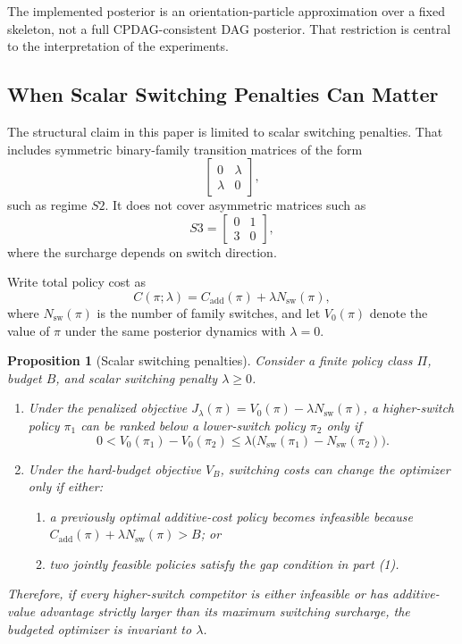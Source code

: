 \documentclass[10pt]{article}
\newcommand{\VB}{V_B}
\newcommand{\Jlambda}{J_\lambda}
\newcommand{\Nsw}{N_{\mathrm{sw}}}
\newtheorem{proposition}{Proposition}
\begin{document}
The implemented posterior is an orientation-particle approximation over a fixed skeleton, not a full CPDAG-consistent DAG posterior. That restriction is central to the interpretation of the experiments.

\subsection{When Scalar Switching Penalties Can Matter}
The structural claim in this paper is limited to scalar switching penalties. That includes symmetric binary-family transition matrices of the form
\[
\begin{bmatrix}
0 & \lambda \\
\lambda & 0
\end{bmatrix},
\]
such as regime $S2$. It does not cover asymmetric matrices such as
\[
S3=
\begin{bmatrix}
0 & 1 \\
3 & 0
\end{bmatrix},
\]
where the surcharge depends on switch direction.

Write total policy cost as
\begin{equation}
C(\pi;\lambda)=C_{\mathrm{add}}(\pi)+\lambda \Nsw(\pi),
\end{equation}
where $\Nsw(\pi)$ is the number of family switches, and let $V_0(\pi)$ denote the value of $\pi$ under the same posterior dynamics with $\lambda=0$.

\begin{proposition}[Scalar switching penalties]
\label{prop:scalar}
Consider a finite policy class $\Pi$, budget $B$, and scalar switching penalty $\lambda\ge 0$.
\begin{enumerate}[leftmargin=1.1em]
  \item Under the penalized objective $\Jlambda(\pi)=V_0(\pi)-\lambda\Nsw(\pi)$, a higher-switch policy $\pi_1$ can be ranked below a lower-switch policy $\pi_2$ only if
  \begin{equation}
  0<V_0(\pi_1)-V_0(\pi_2)\le
  \lambda\bigl(\Nsw(\pi_1)-\Nsw(\pi_2)\bigr).
  \end{equation}
  \item Under the hard-budget objective $\VB$, switching costs can change the optimizer only if either:
  \begin{enumerate}[leftmargin=1.1em]
    \item a previously optimal additive-cost policy becomes infeasible because $C_{\mathrm{add}}(\pi)+\lambda\Nsw(\pi)>B$; or
    \item two jointly feasible policies satisfy the gap condition in part (1).
  \end{enumerate}
\end{enumerate}
Therefore, if every higher-switch competitor is either infeasible or has additive-value advantage strictly larger than its maximum switching surcharge, the budgeted optimizer is invariant to $\lambda$.
\end{proposition}
\end{document}
